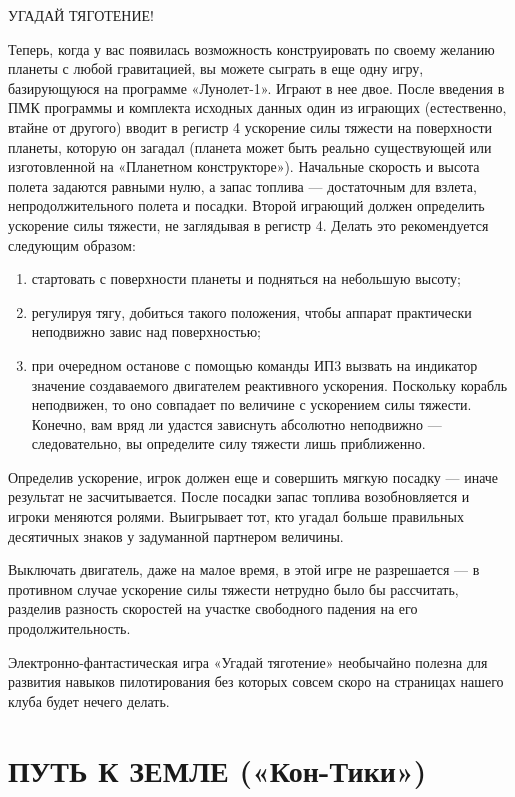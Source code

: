 \documentclass[11pt,a4paper,oneside]{article}
\begin{document}
УГАДАЙ ТЯГОТЕНИЕ!

Теперь, когда у вас появилась возможность конструировать по своему желанию планеты с любой гравитацией, вы можете сыграть в еще одну игру, базирующуюся на программе «Лунолет-1». Играют в нее двое. После введения в ПМК программы и комплекта исходных данных один из играющих (естественно, втайне от другого) вводит в регистр 4 ускорение силы тяжести на поверхности планеты, которую он загадал (планета может быть реально существующей или изготовленной на «Планетном конструкторе»). Начальные скорость и высота полета задаются равными нулю, а запас топлива — достаточным для взлета, непродолжительного полета и посадки. Второй играющий должен определить ускорение силы тяжести, не заглядывая в регистр 4. Делать это рекомендуется следующим образом:
\begin{enumerate}
\item стартовать с поверхности планеты и подняться на небольшую высоту; 
\item регулируя тягу, добиться такого положения, чтобы аппарат практически неподвижно завис над поверхностью;
\item при очередном останове с помощью команды ИП3 вызвать на индикатор значение создаваемого двигателем реактивного ускорения. Поскольку корабль неподвижен, то оно совпадает по величине с ускорением силы тяжести. Конечно, вам вряд ли удастся зависнуть абсолютно неподвижно — следовательно, вы определите силу тяжести лишь приближенно. 
\end{enumerate}

Определив ускорение, игрок должен еще и совершить мягкую посадку — иначе результат не засчитывается. После посадки запас топлива возобновляется и игроки меняются ролями. Выигрывает тот, кто угадал больше правильных десятичных знаков у задуманной партнером величины.

Выключать двигатель, даже на малое время, в этой игре не разрешается — в противном случае ускорение силы тяжести нетрудно было бы рассчитать, разделив разность скоростей на участке свободного падения на его продолжительность.

Электронно-фантастическая игра «Угадай тяготение» необычайно полезна для развития навыков пилотирования без которых совсем скоро на страницах нашего клуба будет нечего делать.

\section{ПУТЬ К ЗЕМЛЕ («Кон-Тики»)}
\end{document}
